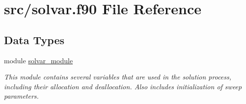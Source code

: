 \hypertarget{solvar_8f90}{\section{src/solvar.f90 File Reference}
\label{solvar_8f90}
}
\subsection*{Data Types}
\begin{DoxyCompactItemize}
\item 
module \hyperlink{classsolvar__module}{solvar\-\_\-module}
\begin{DoxyCompactList}\small\item\em This module contains several variables that are used in the solution process, including their allocation and deallocation. Also includes initialization of sweep parameters. \end{DoxyCompactList}\end{DoxyCompactItemize}
